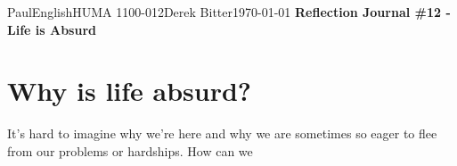 \documentclass[12pt,letterpaper]{article}
\begin{document}
\begin{mla}{Paul}{English}{HUMA 1100-012}{Derek
    Bitter}{\today}    
    {\textbf{Reflection Journal \#12 - Life is Absurd}}

\section*{Why is life absurd?}

It's hard to imagine why we're here and why we are sometimes so eager to flee from our problems or hardships. How can we 

\end{mla}
\end{document}
